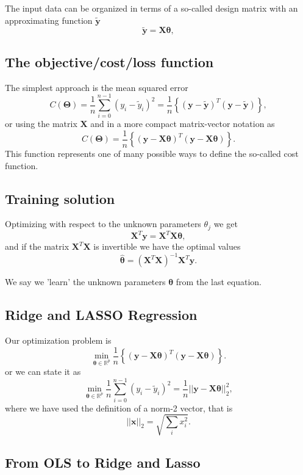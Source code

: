 \documentclass[%
oneside,                 %
final,                   %
10pt]{article}
\begin{document}
The input data can be organized in terms of a so-called design matrix 
with an approximating function $\bm{\tilde{y}}$ 
\[
\bm{\tilde{y}}= \bm{X}\bm{\theta},
\]

\subsection{The objective/cost/loss function}

The  simplest approach is the mean squared error
\[
C(\bm{\Theta})=\frac{1}{n}\sum_{i=0}^{n-1}\left(y_i-\tilde{y}_i\right)^2=\frac{1}{n}\left\{\left(\bm{y}-\bm{\tilde{y}}\right)^T\left(\bm{y}-\bm{\tilde{y}}\right)\right\},
\]
or using the matrix $\bm{X}$ and in a more compact matrix-vector notation as
\[
C(\bm{\Theta})=\frac{1}{n}\left\{\left(\bm{y}-\bm{X}\bm{\theta}\right)^T\left(\bm{y}-\bm{X}\bm{\theta}\right)\right\}.
\]
This function represents one of many possible ways to define the so-called cost function.

\subsection{Training solution}

Optimizing with respect to the unknown parameters $\theta_j$ we get 
\[
\bm{X}^T\bm{y} = \bm{X}^T\bm{X}\bm{\theta},  
\]
and if the matrix $\bm{X}^T\bm{X}$ is invertible we have the optimal values
\[
\hat{\bm{\theta}} =\left(\bm{X}^T\bm{X}\right)^{-1}\bm{X}^T\bm{y}.
\]

We say we 'learn' the unknown parameters $\bm{\theta}$ from the last equation.

\subsection{Ridge and LASSO Regression}

Our optimization problem is
\[
{\displaystyle \min_{\bm{\theta}\in {\mathbb{R}}^{p}}}\frac{1}{n}\left\{\left(\bm{y}-\bm{X}\bm{\theta}\right)^T\left(\bm{y}-\bm{X}\bm{\theta}\right)\right\}.
\]
or we can state it as
\[
{\displaystyle \min_{\bm{\theta}\in
{\mathbb{R}}^{p}}}\frac{1}{n}\sum_{i=0}^{n-1}\left(y_i-\tilde{y}_i\right)^2=\frac{1}{n}\vert\vert \bm{y}-\bm{X}\bm{\theta}\vert\vert_2^2,
\]
where we have used the definition of  a norm-2 vector, that is
\[
\vert\vert \bm{x}\vert\vert_2 = \sqrt{\sum_i x_i^2}. 
\]

\subsection{From OLS to Ridge and Lasso}
\end{document}
